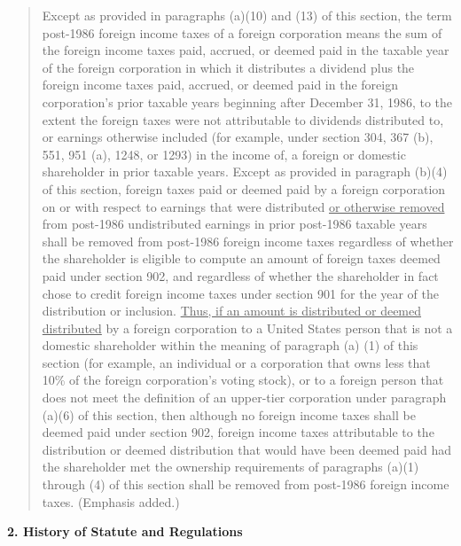 \begin{select}
\begin{quotation}
Except as provided in paragraphs (a)(10) and (13) of this section, the term post-1986 foreign income taxes of a foreign corporation means the sum of the foreign income taxes paid, accrued, or deemed paid in the taxable year of the foreign corporation in which it distributes a dividend plus the foreign income taxes paid, accrued, or deemed paid in the foreign corporation's prior taxable years beginning after December 31, 1986, to the extent the foreign taxes were not attributable to dividends distributed to, or earnings otherwise included (for example, under section 304, 367 (b), 551, 951 (a), 1248, or 1293) in the income of, a foreign or domestic shareholder in prior taxable years. Except as provided in paragraph (b)(4) of this section, foreign taxes paid or deemed paid by a foreign corporation on or with respect to earnings that were distributed \underline{or otherwise removed} from post-1986 undistributed earnings in prior post-1986 taxable years shall be removed from post-1986 foreign income taxes regardless of whether the shareholder is eligible to compute an amount of foreign taxes deemed paid under section 902, and regardless of whether the shareholder in fact chose to credit foreign income taxes under section 901 for the year of the distribution or inclusion. \underline{Thus, if an amount is distributed or deemed distributed} by a foreign corporation to a United States person that is not a domestic shareholder within the meaning of paragraph (a) (1) of this section (for example, an individual or a corporation that owns less that 10\% of the foreign corporation's voting  stock), or to a foreign person that does not meet the definition of an upper-tier corporation under paragraph (a)(6) of this section, then although no foreign income taxes shall be deemed paid under section 902, foreign income taxes attributable to the distribution or deemed distribution that would have been deemed paid had the shareholder met the ownership requirements of paragraphs (a)(1) through (4) of this section shall be removed from post-1986 foreign income taxes. (Emphasis added.)
\end{quotation}

	\begin{center}
		\textbf{2. History of Statute and Regulations}
	\end{center}


\end{select}
